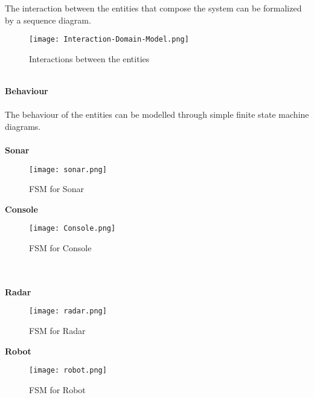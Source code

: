 The interaction between the entities that compose the system can be formalized by a sequence diagram.
\begin{figure}[h]
	\centering
	\texttt{[image: Interaction-Domain-Model.png]}
	\caption{Interactions between the entities}
\end{figure}
\\\textbf{Behaviour} \\\\
The behaviour of the entities can be modelled through simple finite state machine diagrams.
\\\\
\textbf{Sonar}
\begin{figure}[h]
	\centering
	\texttt{[image: sonar.png]}
	\caption{FSM for Sonar}
\end{figure}
\clearpage
\textbf{Console}
\begin{figure}[h]
	\centering
	\texttt{[image: Console.png]}
	\caption{FSM for Console}
\end{figure}
\\\\
\textbf{Radar}
\begin{figure}[h]
	\centering
	\texttt{[image: radar.png]}
	\caption{FSM for Radar}
\end{figure}
\clearpage
\textbf{Robot}
\begin{figure}[h]
	\centering
	\texttt{[image: robot.png]}
	\caption{FSM for Robot}
\end{figure}